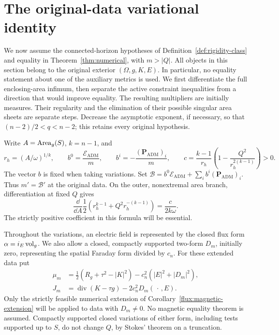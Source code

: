 \section{The original-data variational identity}
\label{var:section}

We now assume the connected-horizon hypotheses of
Definition~\ref{def:rigidity-class} and equality in
Theorem~\ref{thm:numerical}, with $m>|Q|$.  All objects in this section
belong to the original exterior $(\Omega,g,K,E)$.  In particular, no
equality statement about one of the auxiliary metrics is used.  We first
differentiate the full enclosing-area infimum, then separate the active
constraint inequalities from a direction that would improve equality.
The resulting multipliers are initially measures.  Their regularity and
the elimination of their possible singular area sheets are separate
steps.
Decrease the asymptotic exponent, if necessary, so that
$(n-2)/2<q<n-2$; this retains every original hypothesis.

Write $A=\operatorname{Area}_g(S)$, $k=n-1$, and
\begin{equation}
 r_h=(A/\omega)^{1/k},\qquad
 b^0=\frac{\mathcal E_{\mathrm{ADM}}}{m},\qquad
 b^i=-\frac{(\mathbf P_{\mathrm{ADM}})_i}{m},\qquad
 c=\frac{k-1}{r_h}\left(1-\frac{Q^2}{r_h^{2(k-1)}}\right)>0.
 \label{var:constants}
\end{equation}
The vector $b$ is fixed when taking variations.  Set
$\mathcal B=b^0\mathcal E_{\mathrm{ADM}}+\sum_i b^i
(\mathbf P_{\mathrm{ADM}})_i$.  Thus $m'=\mathcal B'$ at the original
data.  On the outer, nonextremal area branch, differentiation at fixed
$Q$ gives
\begin{equation}
 \frac{\dd}{\dd A}\frac12
 \left(r_h^{k-1}+Q^2r_h^{-(k-1)}\right)
 =\frac{c}{2k\omega}.
 \label{var:area-coefficient}
\end{equation}
The strictly positive coefficient in this formula will be essential.

Throughout the variations, an electric field is represented by the
closed flux form $\alpha=i_E\operatorname{vol}_g$.  We also allow a closed, compactly
supported two-form $D_m$, initially zero, representing the spatial
Faraday form divided by $c_n$.  For these extended data put
\begin{equation}
 \begin{split}
 \mu_m&=\frac12(R_g+\tau^2-|K|^2)
              -c_n^2(|E|^2+|D_m|^2),\\
 J_m&=\operatorname{div}(K-\tau g)-2c_n^2D_m(\,\cdot\,,E).
 \end{split}
 \label{var:magnetic-constraints}
\end{equation}
Only the strictly feasible numerical extension of
Corollary~\ref{flux:magnetic-extension} will be applied to data with
$D_m\ne0$.  No magnetic equality theorem is assumed.  Compactly
supported closed variations of either form, including tests supported
up to $S$, do not change $Q$, by Stokes' theorem on a truncation.

